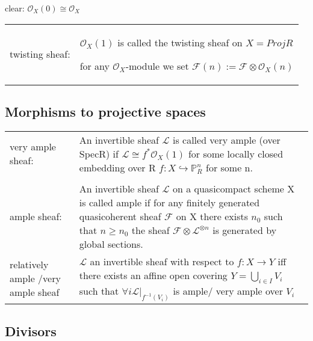 \documentclass[a4paper, 12pt]{article}
\newcommand{\ca}[1]{\mathcal{#1}}
\newcommand{\caf}{\mathcal{F}}
\newcommand{\oxmod}{$\mathcal{O}_X$-module }
\newcommand{\ox}{\mathcal{O}_X}
\begin{document}
clear: $\ox(0) \cong \ox$\\

\begin{tabular}{p{4cm} p{11cm}}

twisting sheaf: & $\ox(1)$ is called the twisting sheaf on $X = ProjR$

  for any \oxmod we set $\caf(n) := \caf\otimes\ox(n)$
  \\
  \end{tabular}

\subsection{Morphisms to projective spaces}

\begin{tabular}{p{4cm} p{11cm}}

very ample sheaf: &  An invertible sheaf $\ca{L}$ is called very ample (over SpecR) if $\ca{L} \cong f^{\ast}\ox(1)$ for some locally closed embedding over R $f:X\hookrightarrow \mathbb{P}^n_R $ for some n.
\\

\\

  ample sheaf:& An invertible sheaf $\ca{L}$ on a quasicompact scheme X is called ample if for any finitely generated quasicoherent sheaf $\caf$ on X there exists $n_0$ such that $n \geq n_0 $ the sheaf $\caf\otimes\ca{L}^{\otimes n}$ is generated by global sections.

  \\


  relatively ample /very ample sheaf & $\ca{L}$ an invertible sheaf with respect to $f:X\longrightarrow Y$ iff there exists an affine open covering $Y = \bigcup_{i\in I} V_i$ such that $\forall i \ca{L}|_{f^{-1}(V_i)}$ is ample/ very ample over $V_i$
  \\
\end{tabular}

\subsection{Divisors}
\end{document}
